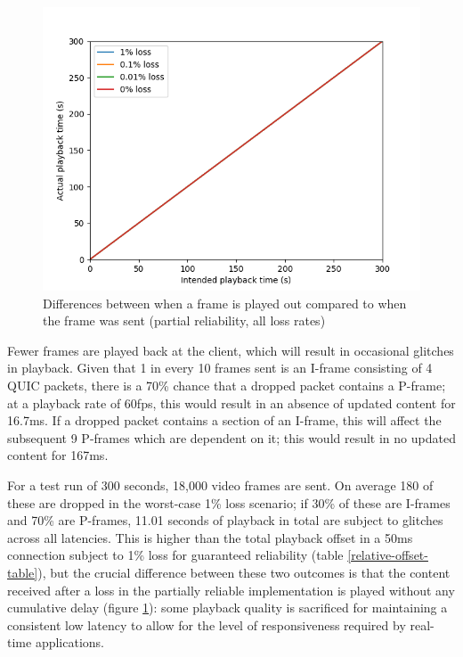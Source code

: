 \documentclass{mpaper}
\begin{document}
\begin{figure}[h]
\includegraphics[scale=0.5]{images/graphics-partial/50ms-relative-offsets-combined-PARTIAL.png}
\centering
\caption{Differences between when a frame is played out compared to when the frame was sent (partial reliability, all loss rates)}
\label{playback-par}
\end{figure}

Fewer frames are played back at the client, which will result in occasional glitches in playback. Given that 1 in every 10 frames sent is an I-frame consisting of 4 QUIC packets, there is a 70\% chance that a dropped packet contains a P-frame; at a playback rate of 60fps, this would result in an absence of updated content for 16.7ms. If a dropped packet contains a section of an I-frame, this will affect the subsequent 9 P-frames which are dependent on it; this would result in no updated content for 167ms. 

For a test run of 300 seconds, 18,000 video frames are sent. On average 180 of these are dropped in the worst-case 1\% loss scenario; if 30\% of these are I-frames and 70\% are P-frames, 11.01 seconds of playback in total are subject to glitches across all latencies. This is higher than the total playback offset in a 50ms connection subject to 1\% loss for guaranteed reliability (table \ref{relative-offset-table}), but the crucial difference between these two outcomes is that the content received after a loss in the partially reliable implementation is played without any cumulative delay (figure \ref{playback-par}): some playback quality is sacrificed for maintaining a consistent low latency to allow for the level of responsiveness required by real-time applications.
\end{document}
